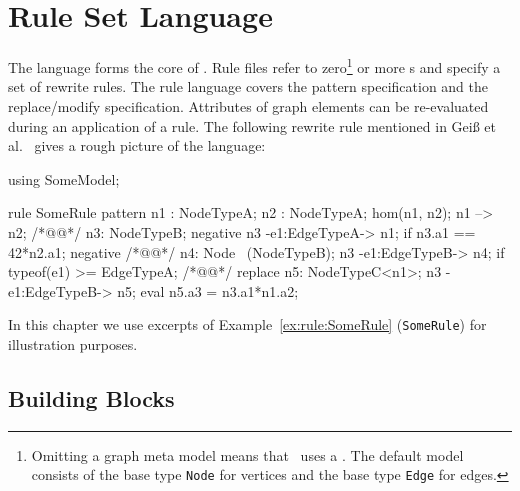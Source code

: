 \chapter{Rule Set Language}
\label{chaprulelang}

The  language forms the core of \GrG. Rule files refer to zero\footnote{Omitting a graph meta model means that \GrG\ uses a . The default model consists of the base type \texttt{Node} for vertices and the base type \texttt{Edge} for edges.} or more s and specify a set of rewrite rules. The rule language covers the pattern specification and the replace/modify specification. Attributes of graph elements can be re-evaluated during an application of a rule. The following rewrite rule mentioned in Geiß et al.~\cite{GBGHS:06} gives a rough picture of the language:
\begin{example}\label{ex:rule:SomeRule}
\begin{grgen}
using SomeModel;

rule SomeRule {
  pattern {
    n1 : NodeTypeA;
    n2 : NodeTypeA;
    hom(n1, n2);
    n1 --> n2; /*@\label{ex:somerule:graphlet}@*/
    n3: NodeTypeB;
    negative {
      n3 -e1:EdgeTypeA-> n1;
      if {n3.a1 == 42*n2.a1;}
    }
    negative { /*@\label{ex:somerule:secondnac:begin}@*/
      n4: Node \ (NodeTypeB);
      n3 -e1:EdgeTypeB-> n4;
      if {typeof(e1) >= EdgeTypeA;}
    } /*@\label{ex:somerule:secondnac:end}@*/
  }
  replace {
    n5: NodeTypeC<n1>;
    n3 -e1:EdgeTypeB-> n5;
    eval {
      n5.a3 = n3.a1*n1.a2;
    }
  }  
}
\end{grgen}
\end{example}
In this chapter we use excerpts of Example~\ref{ex:rule:SomeRule} (\texttt{SomeRule}) for illustration purposes.

\section{Building Blocks}
\label{rulebb}

